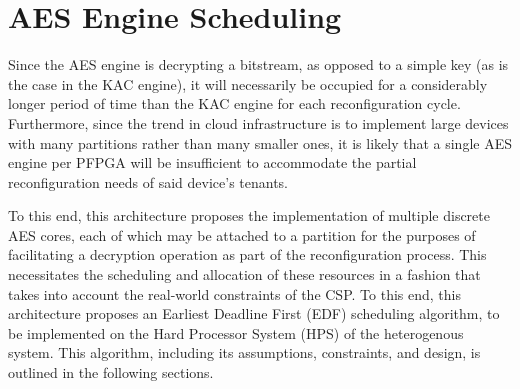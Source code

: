 
\section{AES Engine Scheduling}\label{sec:EDFAlgorithm}

Since the AES engine is decrypting a bitstream, as opposed to a simple key (as is the case in the KAC engine), it will necessarily be occupied for a considerably longer period of time than the KAC engine for each reconfiguration cycle. Furthermore, since the trend in cloud infrastructure is to implement large devices with many partitions rather than many smaller ones, it is likely that a single AES engine per PFPGA will be insufficient to accommodate the partial reconfiguration needs of said device's tenants.

To this end, this architecture proposes the implementation of multiple discrete AES cores, each of which may be attached to a partition for the purposes of facilitating a decryption operation as part of the reconfiguration process. This necessitates the scheduling and allocation of these resources in a fashion that takes into account the real-world constraints of the CSP. To this end, this architecture proposes an Earliest Deadline First (EDF) scheduling algorithm, to be implemented on the Hard Processor System (HPS) of the heterogenous system. This algorithm, including its assumptions, constraints, and design, is outlined in the following sections.

